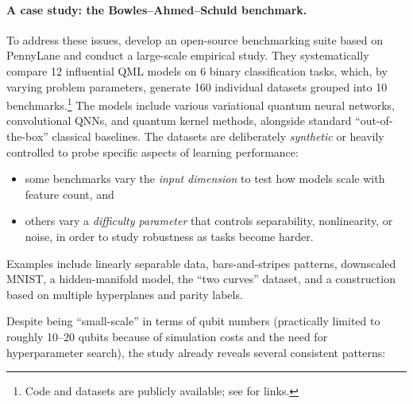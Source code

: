 

\paragraph{A case study: the Bowles--Ahmed--Schuld benchmark.}

To address these issues, \textcite{bowles2024better} develop an open-source benchmarking suite based on PennyLane and conduct a large-scale empirical study. They systematically compare 12 influential QML models on 6 binary classification tasks, which, by varying problem parameters, generate 160 individual datasets grouped into 10 benchmarks.\footnote{Code and datasets are publicly available; see \textcite{bowles2024better} for links.} The models include various variational quantum neural networks, convolutional QNNs, and quantum kernel methods, alongside standard ``out-of-the-box'' classical baselines. The datasets are deliberately \emph{synthetic} or heavily controlled to probe specific aspects of learning performance:
\begin{itemize}
  \item some benchmarks vary the \emph{input dimension} to test how models scale with feature count, and
  \item others vary a \emph{difficulty parameter} that controls separability, nonlinearity, or noise, in order to study robustness as tasks become harder.
\end{itemize}
Examples include linearly separable data, bars-and-stripes patterns, downscaled MNIST, a hidden-manifold model, the ``two curves'' dataset, and a construction based on multiple hyperplanes and parity labels.\cite{bowles2024better}

Despite being ``small-scale'' in terms of qubit numbers (practically limited to roughly 10--20 qubits because of simulation costs and the need for hyperparameter search), the study already reveals several consistent patterns:

